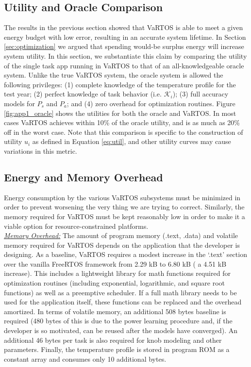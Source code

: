 \subsection{Utility and Oracle Comparison}
The results in the previous section showed that VaRTOS is able to meet a given energy budget with low error, resulting in an accurate system lifetime.  In Section \ref{sec:optimization} we argued that spending would-be surplus energy will increase system utility.  In this section, we substantiate this claim by comparing the utility of the single task app running in VaRTOS to that of an all-knowledgeable oracle system.  Unlike the true VaRTOS system, the oracle system is allowed the following privileges: (1) complete knowledge of the temperature profile for the test year; (2) perfect knowledge of task behavior (i.e. $\mathcal{K}_i$); (3) full accuracy models for $P_s$ and $P_a$; and (4) zero overhead for optimization routines.  Figure \ref{fig:app1_oracle} shows the utilities for both the oracle and VaRTOS.  In most cases VaRTOS achieves within 10\% of the oracle utility, and is as much as 20\% off in the worst case.  Note that this comparison is specific to the construction of utility $u_i$ as defined in Equation \ref{eq:util}, and other utility curves may cause variations in this metric.


\subsection{Energy and Memory Overhead}
Energy consumption by the various VaRTOS subsystems must be minimized in order to prevent worsening the very thing we are trying to correct.  Similarly, the memory required for VaRTOS must be kept reasonably low in order to make it a viable option for resource-constrained platforms.  \\

\noindent\emph{\underline{Memory Overhead:}}
The amount of program memory (.text, .data) and volatile memory required for VaRTOS depends on the application that the developer is designing.  As a baseline, VaRTOS requires a modest increase in the `.text' section over the vanilla FreeRTOS framework from 2.29 kB to 6.80 kB ( a 4.51 kB increase).  This includes a lightweight library for math functions required for optimization routines (including exponential, logarithmic, and square root functions) as well as a preemptive scheduler.  If a full math library needs to be used for the application itself, these functions can be replaced and the overhead amortized.  In terms of volatile memory, an additional 508 bytes baseline is required (480  bytes of this is due to the power learning procedure and, if the developer is so motivated, can be reused after the models have converged).  An additional 46 bytes per task is also required for knob modeling and other parameters.  Finally, the temperature profile is stored in program ROM as a constant array and consumes only 10 additional bytes. \\

